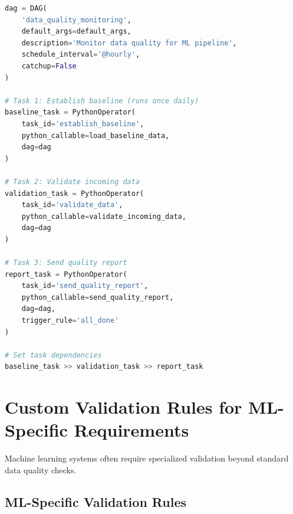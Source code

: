 \begin{lstlisting}[language=Python, caption=Airflow DAG with Data Quality Checks]
dag = DAG(
    'data_quality_monitoring',
    default_args=default_args,
    description='Monitor data quality for ML pipeline',
    schedule_interval='@hourly',
    catchup=False
)

# Task 1: Establish baseline (runs once daily)
baseline_task = PythonOperator(
    task_id='establish_baseline',
    python_callable=load_baseline_data,
    dag=dag
)

# Task 2: Validate incoming data
validation_task = PythonOperator(
    task_id='validate_data',
    python_callable=validate_incoming_data,
    dag=dag
)

# Task 3: Send quality report
report_task = PythonOperator(
    task_id='send_quality_report',
    python_callable=send_quality_report,
    dag=dag,
    trigger_rule='all_done'
)

# Set task dependencies
baseline_task >> validation_task >> report_task
\end{lstlisting}

\section{Custom Validation Rules for ML-Specific Requirements}

Machine learning systems often require specialized validation beyond standard data quality checks.

\subsection{ML-Specific Validation Rules}

